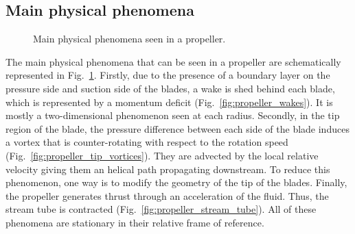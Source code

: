 \subsection{Main physical phenomena}
\label{sub:cror_propeller_physics}

\begin{figure}[htp]
  \centering
  \quad{}
  \quad{}
  \caption{Main physical phenomena seen in a propeller.}
  \label{fig:propeller_phys_phenomena}
\end{figure}
The main physical phenomena that can be seen in a propeller are schematically represented
in Fig.~\ref{fig:propeller_phys_phenomena}. Firstly, due to the presence of a boundary
layer on the pressure side and suction side of the blades, a wake is shed behind each blade, which
is represented by a momentum deficit (Fig.~\ref{fig:propeller_wakes}). 
It is mostly a two-dimensional
phenomenon seen at each radius. Secondly, 
in the tip region of the blade, the pressure difference between each 
side of the blade induces a vortex that is counter-rotating with respect to 
the rotation speed (Fig.~\ref{fig:propeller_tip_vortices}). 
They are advected by the local relative velocity giving them
an helical path propagating downstream.
To reduce this phenomenon, one way is to modify the geometry of the tip
of the blades.
Finally, the propeller generates thrust through an acceleration of the fluid. Thus, the stream
tube is contracted (Fig.~\ref{fig:propeller_stream_tube}). 
All of these phenomena are stationary in their relative frame of reference.
